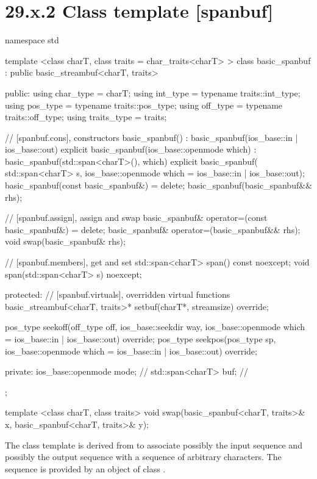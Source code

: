\documentclass[ebook,11pt,article]{memoir}
\renewcommand{\iref}[1]{[#1]}
\begin{document}
\section{29.x.2 Class template  [spanbuf]}
\begin{codeblock}
namespace std {
  template <class charT, class traits = char_traits<charT> >
  class basic_spanbuf
    : public basic_streambuf<charT, traits> {
  public:
    using char_type      = charT;
    using int_type       = typename traits::int_type;
    using pos_type       = typename traits::pos_type;
    using off_type       = typename traits::off_type;
    using traits_type    = traits;

    // \iref{spanbuf.cons}, constructors
    basic_spanbuf() : basic_spanbuf(ios_base::in | ios_base::out) {}
    explicit basic_spanbuf(ios_base::openmode which)
      : basic_spanbuf(std::span<charT>(), which) {}
    explicit basic_spanbuf(
      std::span<charT> s,
      ios_base::openmode which = ios_base::in | ios_base::out);
    basic_spanbuf(const basic_spanbuf&) = delete;
    basic_spanbuf(basic_spanbuf&& rhs);

    // \iref{spanbuf.assign}, assign and swap
    basic_spanbuf& operator=(const basic_spanbuf&) = delete;
    basic_spanbuf& operator=(basic_spanbuf&& rhs);
    void swap(basic_spanbuf& rhs);

    // \iref{spanbuf.members}, get and set
    std::span<charT> span() const noexcept;
    void span(std::span<charT> s) noexcept;

  protected:
    // \iref{spanbuf.virtuals}, overridden virtual functions
    basic_streambuf<charT, traits>* setbuf(charT*, streamsize) override;

    pos_type seekoff(off_type off, ios_base::seekdir way,
                     ios_base::openmode which
                      = ios_base::in | ios_base::out) override;
    pos_type seekpos(pos_type sp,
                     ios_base::openmode which
                      = ios_base::in | ios_base::out) override;

  private:
    ios_base::openmode mode;  // \expos
    std::span<charT> buf; // \expos
  };

  template <class charT, class traits>
    void swap(basic_spanbuf<charT, traits>& x,
              basic_spanbuf<charT, traits>& y);
}
\end{codeblock}

\pnum
The class template
is derived from
to associate possibly the input sequence and possibly
the output sequence with a sequence of arbitrary characters.
The sequence is provided by an object of class
.
\end{document}
